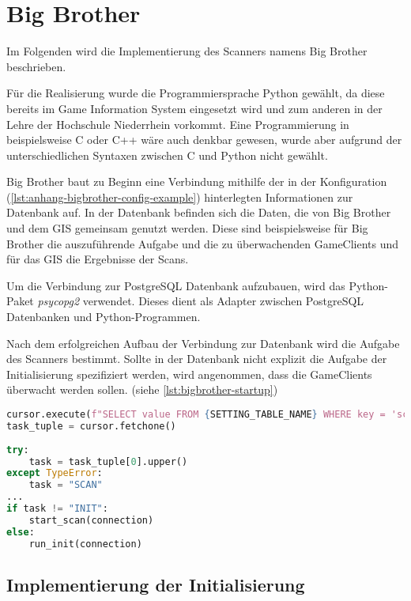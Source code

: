 \section{Big Brother}

Im Folgenden wird die Implementierung des Scanners namens Big Brother beschrieben.

Für die Realisierung wurde die Programmiersprache Python gewählt, da diese bereits im \linebreak Game Information System eingesetzt wird und zum anderen in der Lehre der Hochschule Niederrhein vorkommt. Eine Programmierung in beispielsweise C oder C++ wäre auch denkbar gewesen, wurde aber aufgrund der unterschiedlichen Syntaxen zwischen C und Python nicht gewählt.

Big Brother baut zu Beginn eine Verbindung mithilfe der in der Konfiguration (\autoref{lst:anhang-bigbrother-config-example}) hinterlegten Informationen zur Datenbank auf. In der Datenbank befinden sich die Daten, die von Big Brother und dem GIS gemeinsam genutzt werden. Diese sind beispielsweise für Big Brother die auszuführende Aufgabe und die zu überwachenden GameClients und für das GIS die Ergebnisse der Scans.

Um die Verbindung zur PostgreSQL Datenbank aufzubauen, wird das Python-Paket \textit{psycopg2} verwendet. Dieses dient als Adapter zwischen PostgreSQL Datenbanken und \linebreak Python-Programmen. 

Nach dem erfolgreichen Aufbau der Verbindung zur Datenbank wird die Aufgabe des \linebreak Scanners bestimmt. Sollte in der Datenbank nicht explizit die Aufgabe der Initialisierung \linebreak spezifiziert werden, wird angenommen, dass die GameClients überwacht werden sollen. (siehe \autoref{lst:bigbrother-startup})

\begin{lstlisting}[language=Python, frame=single, caption={Aufgabe des Scanners}, captionpos=b, label={lst:bigbrother-startup}]
cursor.execute(f"SELECT value FROM {SETTING_TABLE_NAME} WHERE key = 'scanner.task'")
task_tuple = cursor.fetchone()
	
try:
	task = task_tuple[0].upper()
except TypeError:
	task = "SCAN"
...
if task != "INIT":
	start_scan(connection)
else:
	run_init(connection)	
\end{lstlisting}


\subsection{Implementierung der Initialisierung}

